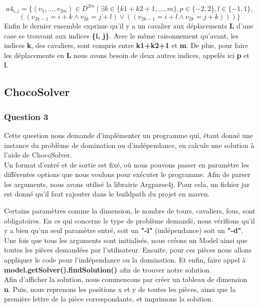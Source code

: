\documentclass{article}
\begin{document}
$$u4_{i,j} = \{(v_{1}, ..., v_{2m}) \in  D^{2m} \mid \exists k \in \{k1+k2+1, ..., m\}, p \in \{-2, 2 \}, l \in \{-1, 1\},$$
 $$((v_{2k-1} = i+k \wedge v_{2k} = j+l)  \vee ((v_{2k-1} = i+l \wedge v_{2k} = j+k)))\}$$
Enfin le dernier ensemble exprime qu'il y a un cavalier aux déplacements \textbf{L} d'une case se trouvant aux indices \textbf{\{i, j\}}. Avec le même raisonnement qu'avant, les indices \textbf{k}, des cavaliers, sont compris entre \textbf{k1+k2+1} et \textbf{m}. De plus, pour faire les déplacements en \textbf{L} nous avons besoin de deux autres indices, appelés ici \textbf{p} et \textbf{l}.

\subsection{ChocoSolver}

\subsubsection{Question 3}
Cette question nous demande d'implémenter un programme qui, étant donné une instance du problème de domination ou d'indépendance, en calcule une solution à l'aide de ChocoSolver.\\

Un format d'entré et de sortie est fixé, où nous pouvons passer en paramètre les différentes options que nous voulons pour exécuter le programme. 
Afin de parser les arguments, nous avons utilisé la librairie Argparse4j. Pour cela, un fichier jar est donné qu'il faut rajouter dans le buildpath du projet en maven. 

Certains paramètres comme la dimension, le nombre de tours, cavaliers, fous, sont obligatoires. En ce qui concerne le type de problème demandé, nous vérifions qu'il y a bien qu'un seul paramètre entré, soit un \textbf{"-i"} (indépendance) soit un \textbf{"-d"}. \\

Une fois que tous les arguments sont initialisés, nous créons un Model ainsi que toutes les pièces demandées par l'utilisateur. Ensuite, pour ces pièces nous allons appliquer le code pour l'indépendance ou la domination. Et enfin, faire appel à \textbf{model.getSolver().findSolution()} afin de trouver notre solution.\\

Afin d'afficher la solution, nous commencons par créer un tableau de dimension \textbf{n}. Puis, nous reprenons les positions x et y de toutes les pièces, ainsi que la première lettre de la pièce correspondante, et imprimons la solution. \\
\end{document}

